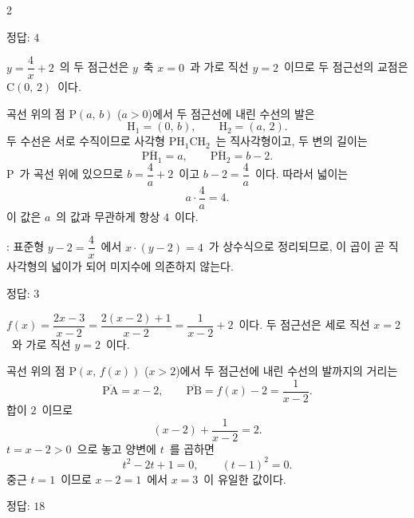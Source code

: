 \documentclass[10pt,fleqn]{article}
\begin{document}
\dmsoltitlefirsttrue
\begin{multicols*}{2}

\begin{dmanswerbox}
정답: $4$
\end{dmanswerbox}

$y=\dfrac{4}{x}+2$\ 의 두 점근선은 $y$\ 축 $x=0$\ 과 가로 직선 $y=2$\ 이므로 두 점근선의 교점은 $\mathrm{C}(0,\, 2)$\ 이다.

곡선 위의 점 $\mathrm{P}(a,\, b)$ ($a>0$)에서 두 점근선에 내린 수선의 발은
\[ \mathrm{H}_{1}=(0,\, b),\qquad \mathrm{H}_{2}=(a,\, 2). \]
두 수선은 서로 수직이므로 사각형 $\mathrm{PH}_{1}\mathrm{CH}_{2}$\ 는 직사각형이고, 두 변의 길이는
\[ \overline{\mathrm{PH}_{1}}=a,\qquad \overline{\mathrm{PH}_{2}}=b-2. \]
$\mathrm{P}$\ 가 곡선 위에 있으므로 $b=\dfrac{4}{a}+2$\ 이고 $b-2=\dfrac{4}{a}$\ 이다. 따라서 넓이는
\[ a\cdot\dfrac{4}{a}=4. \]
이 값은 $a$\ 의 값과 무관하게 항상 $4$\ 이다.

\begin{dmcriticalpoint}
: 표준형 $y-2=\dfrac{4}{x}$\ 에서 $x\cdot(y-2)=4$\ 가 상수식으로 정리되므로, 이 곱이 곧 직사각형의 넓이가 되어 미지수에 의존하지 않는다.
\end{dmcriticalpoint}

\begin{dmanswerbox}
정답: $3$
\end{dmanswerbox}

$f(x)=\dfrac{2x-3}{x-2}=\dfrac{2(x-2)+1}{x-2}=\dfrac{1}{x-2}+2$\ 이다. 두 점근선은 세로 직선 $x=2$\ 와 가로 직선 $y=2$\ 이다.

곡선 위의 점 $\mathrm{P}(x,\, f(x))$ ($x>2$)에서 두 점근선에 내린 수선의 발까지의 거리는
\[ \overline{\mathrm{PA}}=x-2,\qquad \overline{\mathrm{PB}}=f(x)-2=\dfrac{1}{x-2}. \]
합이 $2$\ 이므로
\[ (x-2)+\dfrac{1}{x-2}=2. \]
$t=x-2>0$\ 으로 놓고 양변에 $t$\ 를 곱하면
\[ t^{2}-2t+1=0,\qquad (t-1)^{2}=0. \]
중근 $t=1$\ 이므로 $x-2=1$\ 에서 $x=3$\ 이 유일한 값이다.
\begin{dmanswerbox}
정답: $18$
\end{dmanswerbox}


\end{multicols*}
\end{document}
